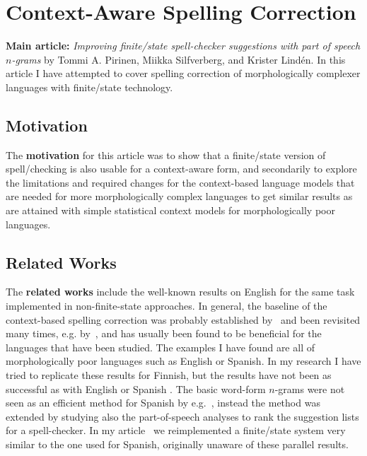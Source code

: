 \documentclass[officiallayout,final]{unihelcompling}
\begin{document}
\section{Context-Aware Spelling Correction}
\label{sec:context}

\textbf{Main article:} \emph{Improving finite\-/state spell-checker suggestions
with part of speech \(n\)-grams} by Tommi A. Pirinen, Miikka Silfverberg, and
Krister Lindén. In this article I have attempted to cover spelling
correction of morphologically complexer languages with finite\-/state
technology.

\subsection{Motivation}

The \textbf{motivation} for this article was to show that a finite\-/state
version of spell\-/checking is also usable for a context-aware form, and
secondarily to explore the limitations and required changes for the
context-based language models that are needed for more morphologically complex
languages to get similar results as are attained with simple statistical
context models for morphologically poor languages.

\subsection{Related Works}

The \textbf{related works} include the well-known results on English for the
same task implemented in non-finite-state approaches.  In general, the baseline
of the context-based spelling correction was probably established
by~\citet{mays1991context} and been revisited many times, e.g.
by~\citet{wilcox-ohearn2008realword}, and has usually been found to be
beneficial for the languages that have been studied. The examples I have found
are all of morphologically poor languages such as English or Spanish. In my
research I have tried to replicate these results for Finnish, but the results
have not been as successful as with English or Spanish .  The basic word-form
\(n\)-grams were not seen as an efficient method for Spanish by
e.g.~\citet{otero2007contextual}, instead the method was extended by studying
also the part-of-speech analyses to rank the suggestion lists for a
spell-checker. In my article~ we reimplemented
a finite\-/state system very similar to the one used for Spanish, originally
unaware of these parallel results.
\end{document}
